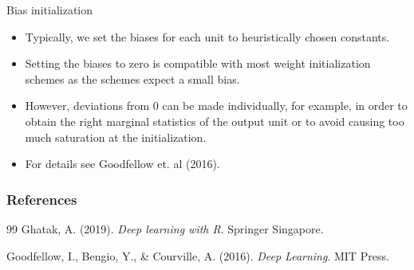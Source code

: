 \documentclass[11pt,compress,t,notes=noshow, xcolor=table]{beamer}
\begin{document}
\begin{vbframe}{Bias initialization}
  \begin{itemize}
    \item Typically, we set the biases for each unit to heuristically chosen constants. 
    \item Setting the biases to zero is compatible with most weight
initialization schemes as the schemes expect a small bias. 
    \item However, deviations from 0 can be made individually, for example, in order to obtain the right marginal statistics of the output unit or to avoid causing too much saturation at the initialization.
    \item For details see Goodfellow et. al (2016).
  \end{itemize}
\end{vbframe}



\begin{vbframe}
\frametitle{References}
\footnotesize{
\begin{thebibliography}{99}
 Ghatak, A. (2019). \textit{Deep learning with R}. Springer Singapore. 

Goodfellow, I., Bengio, Y., \& Courville, A. (2016). \textit{Deep Learning}. MIT Press.
\end{thebibliography}
}
\end{vbframe}




\endlecture
\end{document}
